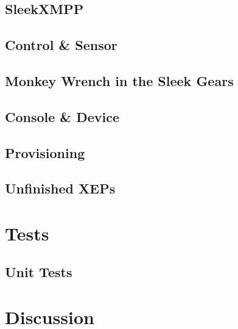 \documentclass{sig-alternate}
\begin{document}


\subsection{SleekXMPP}



\subsection{Control \& Sensor}



\subsection{Monkey Wrench in the Sleek Gears}



\subsection{Console \& Device}



\subsection{Provisioning}



\subsection{Unfinished XEPs}



\section{Tests}

\subsection{Unit Tests}

\section{Discussion}
\end{document}
